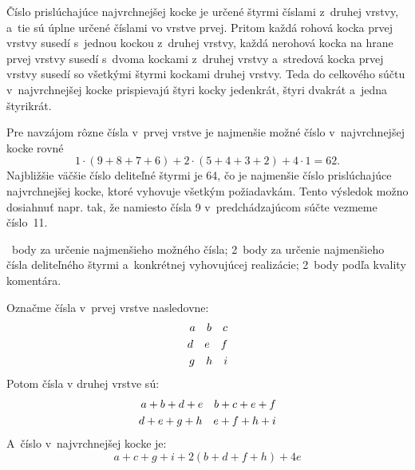 {%
Číslo prislúchajúce najvrchnejšej kocke je určené štyrmi číslami z~druhej vrstvy, a~tie sú úplne určené číslami vo vrstve prvej.
Pritom každá rohová kocka prvej vrstvy susedí s~jednou kockou z~druhej vrstvy, každá nerohová kocka na hrane prvej vrstvy susedí s~dvoma kockami z~druhej vrstvy a~stredová kocka prvej vrstvy susedí so všetkými štyrmi kockami druhej vrstvy.
Teda do celkového súčtu v~najvrchnejšej kocke prispievajú štyri kocky jedenkrát, štyri dvakrát a~jedna štyrikrát.

Pre navzájom rôzne čísla v~prvej vrstve je najmenšie možné číslo v~najvrchnejšej kocke rovné
$$
1\cdot(9+8+7+6)+2\cdot(5+4+3+2)+4\cdot1=62.
$$
Najbližšie väčšie číslo deliteľné štyrmi je 64, čo je najmenšie číslo prislúchajúce najvrchnejšej kocke, ktoré vyhovuje všetkým požiadavkám.
Tento výsledok možno dosiahnuť napr. tak, že namiesto čísla 9 v~predchádzajúcom súčte vezmeme číslo~11.

~body za určenie najmenšieho možného čísla;
2~body za určenie najmenšieho čísla deliteľného štyrmi a~konkrétnej vyhovujúcej realizácie;
2~body podľa kvality komentára.

\poznamka
Označme čísla v~prvej vrstve nasledovne:
$$
\aligned
a\quad b\quad c\\
d\quad e\quad f\\
g\quad h\quad i
\endaligned
$$
Potom čísla v druhej vrstve sú:
$$\aligned
a+b+d+e\quad b+c+e+f\\
d+e+g+h\quad e+f+h+i\\
\endaligned
$$
A~číslo v~najvrchnejšej kocke je:
$$
a+c+g+i+2(b+d+f+h)+4e
$$
\eres
}

